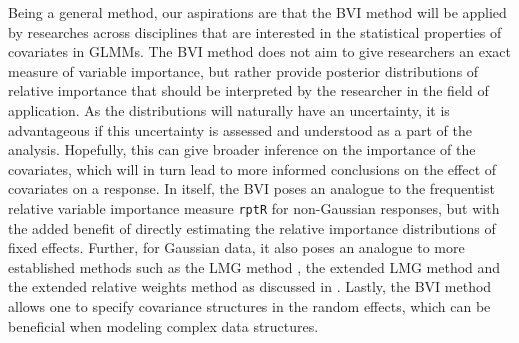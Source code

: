 Being a general method, our aspirations are that the BVI method will be applied by researches across disciplines that are interested in the statistical properties of covariates in GLMMs. The BVI method does not aim to give researchers an exact measure of variable importance, but rather provide posterior distributions of relative importance that should be interpreted by the researcher in the field of application. As the distributions will naturally have an uncertainty, it is advantageous if this uncertainty is assessed and understood as a part of the analysis. Hopefully, this can give broader inference on the importance of the covariates, which will in turn lead to more informed conclusions on the effect of covariates on a response. In itself, the BVI poses an analogue to the frequentist relative variable importance measure \texttt{rptR} for non-Gaussian responses, but with the added benefit of directly estimating the relative importance distributions of fixed effects. Further, for Gaussian data, it also poses an analogue to more established methods such as the LMG method \citep{gromping_relaimpo}, the extended LMG method \citep{matre} and the extended relative weights method \citep{matre} as discussed in \citet{Arnstad:Relative_variable_importance_in_Bayesian_linear_mixed_models:2024}. Lastly, the BVI method allows one to specify covariance structures in the random effects, which can be beneficial when modeling complex data structures.
\\
\\
